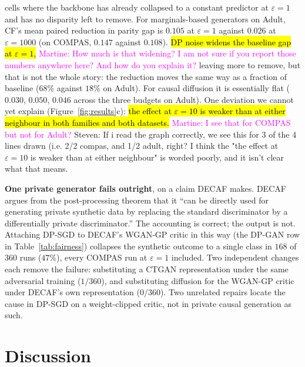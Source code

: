 \documentclass{article}
\newcommand{\martine}[1]{\textcolor{magenta}{Martine: #1}}
\newcommand{\s}[1]{\textcolor{Dandelion}{Steven: #1}}
\begin{document}
cells where the backbone has already collapsed to a constant predictor at
$\varepsilon{=}1$ and has no disparity left to remove. For marginals-based
generators on Adult, CF's mean paired reduction in parity gap is $0.105$ at
$\varepsilon{=}1$ against $0.026$ at $\varepsilon{=}1000$ (on COMPAS, $0.147$
against $0.108$). \hl{DP noise widens the baseline gap at $\varepsilon{=}1$,} \martine{How much is that widening? I am not sure if you report those numbers anywhere here? And how do you explain it?}
leaving more to remove, but that is not the whole story: the reduction moves
the same way as a fraction of baseline ($68\%$ against $18\%$ on Adult). For
causal diffusion it is essentially flat ($0.030$, $0.050$, $0.046$ across the
three budgets on Adult). One deviation we cannot yet explain
(Figure~\ref{fig:results}c): \hl{the effect at $\varepsilon{=}10$ is weaker than
at either neighbour in both families and both datasets.} \martine{I see that for COMPAS but not for Adult?} \s{If i read the graph correctly, we see this for 3 of the 4 lines drawn (i.e. 2/2 compas, and 1/2 adult, right? I think the "the effect at $\varepsilon{=}10$ is weaker than
at either neighbour" is worded poorly, and it isn't clear what that means.}

\textbf{One private generator fails outright}, on a claim DECAF makes. DECAF
argues from the post-processing theorem that it ``can be directly used for
generating private synthetic data by replacing the standard discriminator by
a differentially private discriminator.'' The accounting is correct; the
output is not. Attaching DP-SGD \citep{abadi2016dpsgd} to DECAF's WGAN-GP
critic in this way (the DP-GAN row in Table~\ref{tab:fairness}) collapses
the synthetic outcome to a single class in $168$ of $360$ runs ($47\%$),
every COMPAS run at $\varepsilon{=}1$ included. Two independent changes each
remove the failure: substituting a CTGAN representation under the same
adversarial training ($1/360$), and substituting diffusion for the WGAN-GP
critic under DECAF's own representation ($0/360$). Two unrelated repairs
locate the cause in DP-SGD on a weight-clipped critic, not in private causal
generation as such.

\section{Discussion}
\label{sec:discussion}
\wkDiscussion





\end{document}
